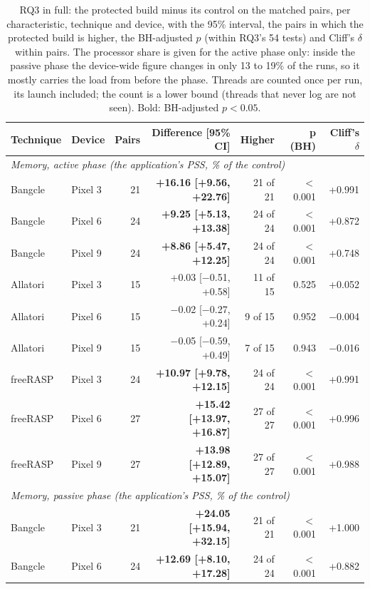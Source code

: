 \begin{table}[t]
\centering
\footnotesize
\caption{RQ3 in full: the protected build minus its control on the matched pairs, per characteristic, technique and device, with the 95\% interval, the pairs in which the protected build is higher, the BH-adjusted $p$ (within RQ3's 54 tests) and Cliff's $\delta$ within pairs. The processor share is given for the active phase only: inside the passive phase the device-wide figure changes in only 13 to 19\% of the runs, so it mostly carries the load from before the phase. Threads are counted once per run, its launch included; the count is a lower bound (threads that never log are not seen). Bold: BH-adjusted $p < 0.05$.}
\label{tab:rq4-full}
\begin{tabular}{llrrrrr}
\toprule
\textbf{Technique} & \textbf{Device} & \textbf{Pairs} & \textbf{Difference [95\% CI]} & \textbf{Higher} & \textbf{p (BH)} & \textbf{Cliff's $\delta$} \\
\midrule
\multicolumn{7}{l}{\textit{Memory, active phase (the application's PSS, \% of the control)}} \\
Bangcle & Pixel 3 & 21 & \textbf{+16.16 [+9.56, +22.76]} & 21 of 21 & $<$ 0.001 & +0.991 \\
Bangcle & Pixel 6 & 24 & \textbf{+9.25 [+5.13, +13.38]} & 24 of 24 & $<$ 0.001 & +0.872 \\
Bangcle & Pixel 9 & 24 & \textbf{+8.86 [+5.47, +12.25]} & 24 of 24 & $<$ 0.001 & +0.748 \\
Allatori & Pixel 3 & 15 & +0.03 [$-$0.51, +0.58] & 11 of 15 & 0.525 & +0.052 \\
Allatori & Pixel 6 & 15 & $-$0.02 [$-$0.27, +0.24] & 9 of 15 & 0.952 & $-$0.004 \\
Allatori & Pixel 9 & 15 & $-$0.05 [$-$0.59, +0.49] & 7 of 15 & 0.943 & $-$0.016 \\
freeRASP & Pixel 3 & 24 & \textbf{+10.97 [+9.78, +12.15]} & 24 of 24 & $<$ 0.001 & +0.991 \\
freeRASP & Pixel 6 & 27 & \textbf{+15.42 [+13.97, +16.87]} & 27 of 27 & $<$ 0.001 & +0.996 \\
freeRASP & Pixel 9 & 27 & \textbf{+13.98 [+12.89, +15.07]} & 27 of 27 & $<$ 0.001 & +0.988 \\
\midrule
\multicolumn{7}{l}{\textit{Memory, passive phase (the application's PSS, \% of the control)}} \\
Bangcle & Pixel 3 & 21 & \textbf{+24.05 [+15.94, +32.15]} & 21 of 21 & $<$ 0.001 & +1.000 \\
Bangcle & Pixel 6 & 24 & \textbf{+12.69 [+8.10, +17.28]} & 24 of 24 & $<$ 0.001 & +0.882 \\

\end{tabular}
\end{table}
